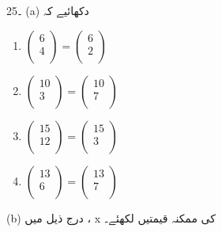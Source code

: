 25۔  (a) دکھائیے کہ
\begin{enumerate}
\item
\(\begin{pmatrix}
6\\ 
4\\ 
\end{pmatrix}
=
\begin{pmatrix}
6\\
2\\
\end{pmatrix}\)\\
\item
\(\begin{pmatrix}
10\\
3\\
\end{pmatrix}
=
\begin{pmatrix}
10\\
7\\
\end{pmatrix}\)\\
\item
\( \begin{pmatrix}
15\\
12\\
\end{pmatrix}
=
\begin{pmatrix}
15\\
3\\
\end{pmatrix}\)\\
\item
\(\begin{pmatrix}
13\\
6\\
\end{pmatrix}
=
\begin{pmatrix}
13\\
7\\
\end{pmatrix}\)
\end{enumerate}
(b)
 درج ذیل میں ،   x کی ممکنہ قیمتیں لکھئے۔ 
